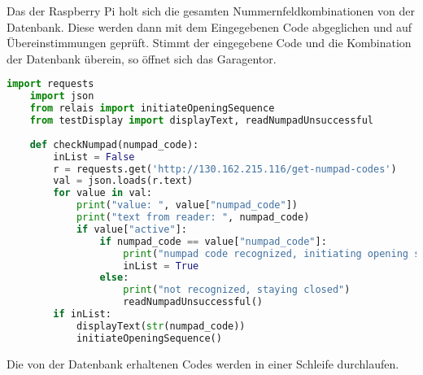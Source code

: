 Das der Raspberry Pi holt sich die gesamten Nummernfeldkombinationen von der Datenbank. Diese werden dann mit dem Eingegebenen Code abgeglichen und auf Übereinstimmungen geprüft. Stimmt der eingegebene Code und die Kombination der Datenbank überein, so öffnet sich das Garagentor.
\begin{lstlisting}[language=python, caption=checkNumpad.py]
    import requests
    import json
    from relais import initiateOpeningSequence
    from testDisplay import displayText, readNumpadUnsuccessful
    
    def checkNumpad(numpad_code):
        inList = False
        r = requests.get('http://130.162.215.116/get-numpad-codes')
        val = json.loads(r.text)
        for value in val:
            print("value: ", value["numpad_code"])
            print("text from reader: ", numpad_code)
            if value["active"]:
                if numpad_code == value["numpad_code"]:
                    print("numpad code recognized, initiating opening sequence")
                    inList = True
                else:
                    print("not recognized, staying closed")
                    readNumpadUnsuccessful()
        if inList:
            displayText(str(numpad_code))
            initiateOpeningSequence()    
\end{lstlisting}

Die von der Datenbank erhaltenen Codes werden in einer Schleife durchlaufen. 

